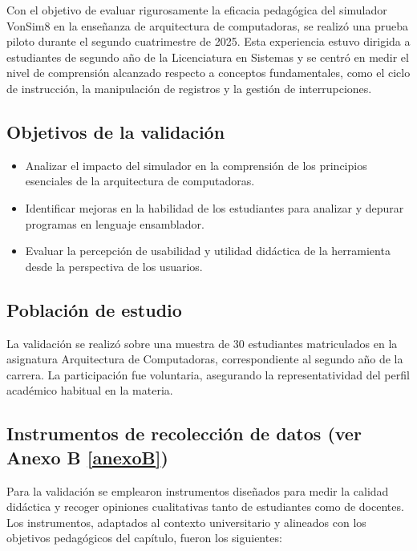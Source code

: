 \documentclass[12pt,oneside]{templates/unerthesis}
\providecommand{\tightlist}{%
  \setlength{\itemsep}{0pt}\setlength{\parskip}{0pt}}
\begin{document}
Con el objetivo de evaluar rigurosamente la eficacia pedagógica del simulador VonSim8 en la enseñanza de arquitectura de computadoras, se realizó una prueba piloto durante el segundo cuatrimestre de 2025. Esta experiencia estuvo dirigida a estudiantes de segundo año de la Licenciatura en Sistemas y se centró en medir el nivel de comprensión alcanzado respecto a conceptos fundamentales, como el ciclo de instrucción, la manipulación de registros y la gestión de interrupciones.

\hypertarget{objetivos-de-la-validaciuxf3n}{%
\subsection{Objetivos de la validación}\label{objetivos-de-la-validaciuxf3n}}

\begin{itemize}
\tightlist
\item
  Analizar el impacto del simulador en la comprensión de los principios esenciales de la arquitectura de computadoras.
\item
  Identificar mejoras en la habilidad de los estudiantes para analizar y depurar programas en lenguaje ensamblador.
\item
  Evaluar la percepción de usabilidad y utilidad didáctica de la herramienta desde la perspectiva de los usuarios.
\end{itemize}

\hypertarget{poblaciuxf3n-de-estudio}{%
\subsection{Población de estudio}\label{poblaciuxf3n-de-estudio}}

La validación se realizó sobre una muestra de 30 estudiantes matriculados en la asignatura Arquitectura de Computadoras, correspondiente al segundo año de la carrera. La participación fue voluntaria, asegurando la representatividad del perfil académico habitual en la materia.

\hypertarget{instrumentos-de-recolecciuxf3n-de-datos-ver-anexo-b-refanexob}{%
\subsection{Instrumentos de recolección de datos (ver Anexo B \ref{anexoB})}\label{instrumentos-de-recolecciuxf3n-de-datos-ver-anexo-b-refanexob}}

Para la validación se emplearon instrumentos diseñados para medir la calidad didáctica y recoger opiniones cualitativas tanto de estudiantes como de docentes. Los instrumentos, adaptados al contexto universitario y alineados con los objetivos pedagógicos del capítulo, fueron los siguientes:
\end{document}
